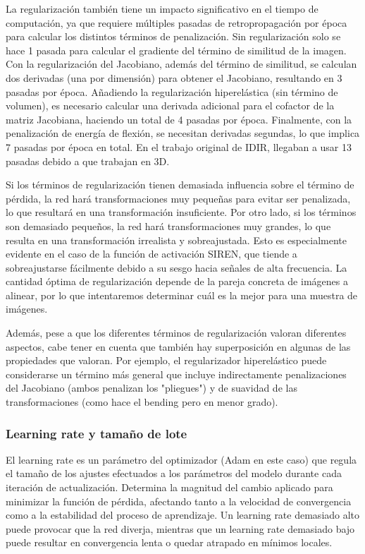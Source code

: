 La regularización también tiene un impacto significativo en el tiempo de computación, ya que requiere múltiples pasadas de retropropagación por época para calcular los distintos términos de penalización.
Sin regularización solo se hace 1 pasada para calcular el gradiente del término de similitud de la imagen.
Con la regularización del Jacobiano, además del término de similitud, se calculan dos derivadas (una por dimensión) para obtener el Jacobiano, resultando en 3 pasadas por época.
Añadiendo la regularización hiperelástica (sin término de volumen), es necesario calcular una derivada adicional para el cofactor de la matriz Jacobiana, haciendo un total de 4 pasadas por época.
Finalmente, con la penalización de energía de flexión, se necesitan derivadas segundas, lo que implica 7 pasadas por época en total.
En el trabajo original de IDIR, llegaban a usar 13 pasadas debido a que trabajan en 3D.

Si los términos de regularización tienen demasiada influencia sobre el término de pérdida, la red hará transformaciones muy pequeñas para evitar ser penalizada, lo que resultará en una transformación insuficiente.
Por otro lado, si los términos son demasiado pequeños, la red hará transformaciones muy grandes, lo que resulta en una transformación irrealista y sobreajustada. Esto es especialmente evidente en el caso de la función de activación SIREN, que tiende a sobreajustarse fácilmente debido a su sesgo hacia señales de alta frecuencia.
La cantidad óptima de regularización depende de la pareja concreta de imágenes a alinear, por lo que intentaremos determinar cuál es la mejor para una muestra de imágenes.

Además, pese a que los diferentes términos de regularización valoran diferentes aspectos, cabe tener en cuenta que también hay superposición en algunas de las propiedades que valoran.
Por ejemplo, el regularizador hiperelástico puede considerarse un término más general que incluye indirectamente penalizaciones del Jacobiano (ambos penalizan los "pliegues") y de suavidad de las transformaciones (como hace el bending pero en menor grado).

\subsubsection{Learning rate y tamaño de lote}
\label{subsubsec:Learning rate e tamaño de lote}

El learning rate es un parámetro del optimizador (Adam en este caso) que regula el tamaño de los ajustes efectuados a los parámetros del modelo durante cada iteración de actualización.
Determina la magnitud del cambio aplicado para minimizar la función de pérdida, afectando tanto a la velocidad de convergencia como a la estabilidad del proceso de aprendizaje.
Un learning rate demasiado alto puede provocar que la red diverja, mientras que un learning rate demasiado bajo puede resultar en convergencia lenta o quedar atrapado en mínimos locales.

